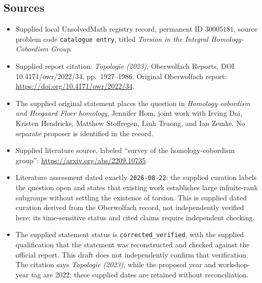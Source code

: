 \documentclass[11pt]{article}
\begin{document}
\subsection{Sources}
\begin{itemize}
\item Supplied local UnsolvedMath registry record, permanent ID \(30005181\), source problem code \texttt{catalogue entry}, titled \emph{Torsion in the Integral Homology-Cobordism Group}.
\item Supplied report citation: \emph{Topologie (2023)}, Oberwolfach Reports, DOI 10.4171/owr/2022/34, pp.~1927--1986. Original Oberwolfach report: \url{https://doi.org/10.4171/owr/2022/34}.
\item The supplied original statement places the question in \emph{Homology cobordism and Heegaard Floer homology}, Jennifer Hom, joint work with Irving Dai, Kristen Hendricks, Matthew Stoffregen, Linh Truong, and Ian Zemke. No separate proposer is identified in the record.
\item Supplied literature source, labeled ``survey of the homology-cobordism group'': \url{https://arxiv.org/abs/2209.10735}.
\item Literature assessment dated exactly \texttt{2026-08-22}: the supplied curation labels the question open and states that existing work establishes large infinite-rank subgroups without settling the existence of torsion. This is supplied dated curation derived from the Oberwolfach record, not independently verified here; its time-sensitive status and cited claims require independent checking.
\item The supplied statement status is \texttt{corrected\_verified}, with the supplied qualification that the statement was reconstructed and checked against the official report. This draft does not independently confirm that verification. The citation says \emph{Topologie (2023)}, while the proposed year and workshop-year tag are 2022; these supplied dates are retained without reconciliation.
\end{itemize}
\end{document}

